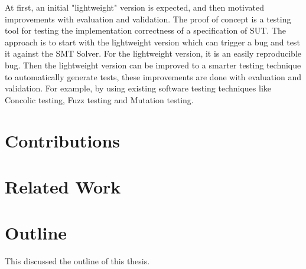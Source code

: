 At first, an initial "lightweight" version is expected, and then motivated 
improvements with evaluation and validation. The proof of concept is a testing
tool for testing the implementation correctness of a specification of SUT. The
approach is to start with the lightweight version which can trigger a bug and
test it against the SMT Solver. For the lightweight version, it is an easily
reproducible bug. Then the lightweight version can be improved to a smarter
testing technique to automatically generate tests, these improvements are done
with evaluation and validation. For example, by using existing software testing
techniques like Concolic testing, Fuzz testing and Mutation testing.

\section{Contributions}

\section{Related Work}

\section{Outline}
This discussed the outline of this thesis.
